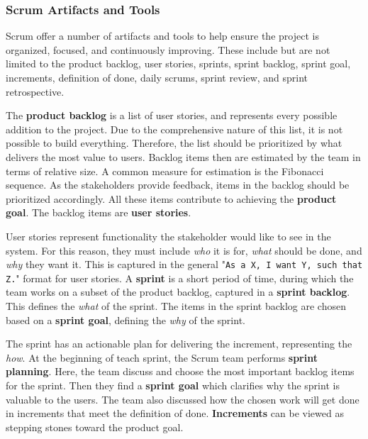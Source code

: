 \subsubsection*{Scrum Artifacts and Tools}
Scrum offer a number of artifacts and tools to help ensure the project is organized, focused, and continuously improving. These include but are not limited to the product backlog, user stories, sprints, sprint backlog, sprint goal, increments, definition of done, daily scrums, sprint review, and sprint retrospective.\cite{sutherlandScrumArtDoing2014}

The \textbf{product backlog} is a list of user stories, and represents every possible addition to the project.
Due to the comprehensive nature of this list, it is not possible to build everything.
Therefore, the list should be prioritized by what delivers the most value to users.
Backlog items then are estimated by the team in terms of relative size.
A common measure for estimation is the Fibonacci sequence.
As the stakeholders provide feedback, items in the backlog should be prioritized accordingly.
All these items contribute to achieving the \textbf{product goal}.
The backlog items are \textbf{user stories}.

User stories represent functionality the stakeholder would like to see in the system.
For this reason, they must include \textit{who} it is for, \textit{what} should be done, and \textit{why} they want it.
This is captured in the general "\texttt{As a X, I want Y, such that Z.}" format for user stories.
A \textbf{sprint} is a short period of time, during which the team works on a subset of the product backlog, captured in a \textbf{sprint backlog}.
This defines the \textit{what} of the sprint.
The items in the sprint backlog are chosen based on a \textbf{sprint goal}, defining the \textit{why} of the sprint.


The sprint has an actionable plan for delivering the increment, representing the \textit{how}. 
At the beginning of teach sprint, the Scrum team performs \textbf{sprint planning}.
Here, the team discuss and choose the most important backlog items for the sprint.
Then they find a \textbf{sprint goal} which clarifies why the sprint is valuable to the users.
The team also discussed how the chosen work will get done in increments that meet the definition of done.
\textbf{Increments} can be viewed as stepping stones toward the product goal.

